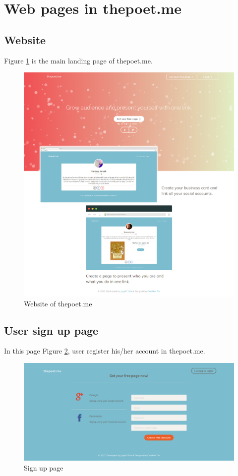 \section{Web pages in thepoet.me}
\subsection{Website}
Figure \ref{straightrebar} is the main landing page of thepoet.me.

\begin{figure}
    \centering \includegraphics[scale=0.35]{images/app/poetwebsite-fullpage.png}
    \caption{Website of thepoet.me}
    \label{straightrebar}
\end{figure}

\subsection{User sign up page}
In this page Figure \ref{poet2}, user register his/her account in thepoet.me. 

\begin{figure}
    \centering \includegraphics[scale=0.35]{images/app/poetsignup-fullpage.png}
    \caption{Sign up page}
    \label{poet2}
\end{figure}

